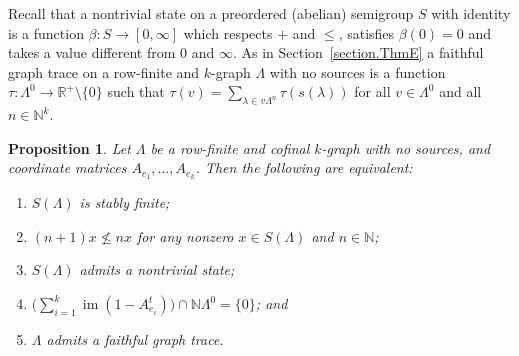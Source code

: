 \documentclass[a4paper, 12pt]{amsart}
\numberwithin{equation}{section}
\newcounter{theorem}
\newtheorem{prop}[theorem]{Proposition}
\theoremstyle{remark}
\theoremstyle{definition}
\begin{document}
Recall that a nontrivial state on a preordered (abelian) semigroup $S$ with identity is a
function $\beta \colon S\to [0,\infty]$ which respects $+$ and $\leq$, satisfies
$\beta(0)=0$ and takes a value different from $0$ and $\infty$. As in Section~\ref{section.ThmE} a faithful graph trace on
a row-finite and $k$-graph $\Lambda$ with no sources is a function $\tau \colon
\Lambda^0\to {\mathbb{R}}^+\setminus\{0\}$ such that $\tau(v)=\sum_{\lambda\in v\Lambda^n}
\tau(s(\lambda))$ for all $v\in \Lambda^0$ and all $n\in {\mathbb{N}}^k$.

\begin{prop}\label{prop.properties.dichotomy.four}
Let $\Lambda$ be a row-finite and cofinal $k$-graph with no sources, and coordinate
matrices $A_{e_1}, \dots , A_{e_k}$. Then the following are equivalent:
\begin{enumerate}
\item\label{prop.properties.dichotomy.four.(1)} $S(\Lambda)$ is stably finite;
\item\label{prop.properties.dichotomy.four.(2)} $(n+1)x\not\leq nx$ for any nonzero $x\in S(\Lambda)$ and $n\in {\mathbb{N}}$;
\item\label{prop.properties.dichotomy.four.(3)} $S(\Lambda)$ admits a nontrivial state;
\item\label{prop.properties.dichotomy.four.(4)} $\big(\sum_{i=1}^k{\operatorname{im}}(1-A^t_{e_i}) \big) \cap {\mathbb{N}}\Lambda^0= \{0\}$; and
\item\label{prop.properties.dichotomy.four.(5)} $\Lambda$ admits a faithful graph trace.
\end{enumerate}
\end{prop}
\end{document}
